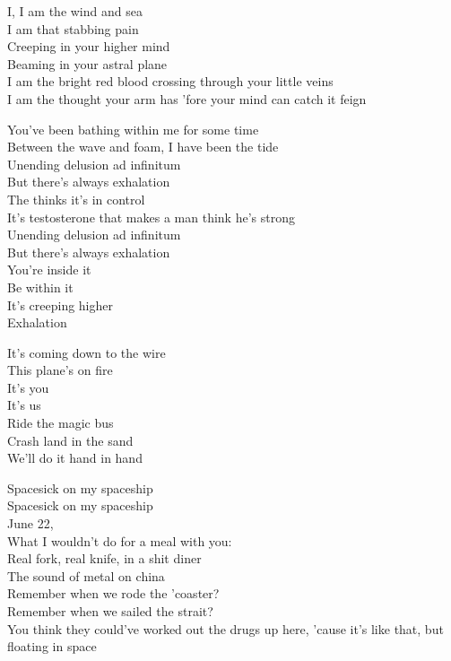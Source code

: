 I, I am the wind and sea \\
I am that stabbing pain \\
Creeping in your higher mind \\
Beaming in your astral plane \\
I am the bright red blood crossing through your little veins \\
I am the thought your arm has 'fore your mind can catch it feign \\


You've been bathing within me for some time \\
Between the wave and foam, I have been the tide \\
Unending delusion ad infinitum \\
But there's always exhalation \\
The  thinks it's in control \\
It's testosterone that makes a man think he's strong \\
Unending delusion ad infinitum \\
But there's always exhalation \\

You're inside it \\
Be within it \\
It's creeping higher \\
Exhalation \\


It's coming down to the wire \\
This plane's on fire \\
It's you \\
It's us \\
Ride the magic bus \\
Crash land in the sand \\
We'll do it hand in hand \\




Spacesick on my spaceship \\
Spacesick on my spaceship \\

June 22, \\
What I wouldn't do for a meal with you: \\
Real fork, real knife, in a shit diner \\
The sound of metal on china \\
Remember when we rode the 'coaster? \\
Remember when we sailed the strait? \\
You think they could've worked out the drugs up here, 'cause it's like that, but floating in space \\

